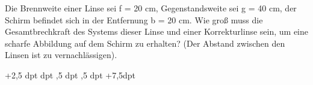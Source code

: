 \documentclass[11pt]{exam}
\begin{document}
\begin{questions}
\vspace{3mm}\question Die Brennweite einer Linse sei f = 20 cm, Gegenstandsweite sei g = 40 cm, der Schirm befindet sich in der Entfernung b = 20 cm. Wie groß muss die Gesamtbrechkraft des Systems dieser Linse und einer Korrekturlinse sein, um eine scharfe Abbildung auf dem Schirm zu erhalten? (Der Abstand zwischen den Linsen ist zu vernachlässigen).

\begin{choices}
	\choice +2,5 dpt
	 dpt
	,5 dpt
	,5 dpt
	\choice +7,5dpt
\end{choices}

\vspace{3mm}\end{questions}
\end{document}
